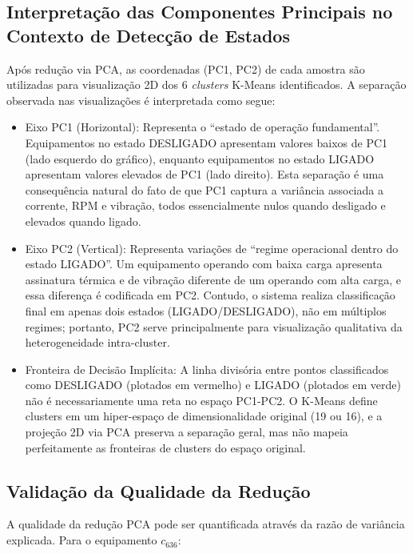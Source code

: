 \subsection{Interpretação das Componentes Principais no Contexto de Detecção de Estados}

Após redução via PCA, as coordenadas (PC1, PC2) de cada amostra são utilizadas para visualização 2D dos 6 \textit{clusters} K-Means identificados. A separação observada nas visualizações é interpretada como segue:

\begin{itemize}
    \item Eixo PC1 (Horizontal): Representa o ``estado de operação fundamental''. Equipamentos no estado DESLIGADO apresentam valores baixos de PC1 (lado esquerdo do gráfico), enquanto equipamentos no estado LIGADO apresentam valores elevados de PC1 (lado direito). Esta separação é uma consequência natural do fato de que PC1 captura a variância associada a corrente, RPM e vibração, todos essencialmente nulos quando desligado e elevados quando ligado.

    \item Eixo PC2 (Vertical): Representa variações de ``regime operacional dentro do estado LIGADO''. Um equipamento operando com baixa carga apresenta assinatura térmica e de vibração diferente de um operando com alta carga, e essa diferença é codificada em PC2. Contudo, o sistema realiza classificação final em apenas dois estados (LIGADO/DESLIGADO), não em múltiplos regimes; portanto, PC2 serve principalmente para visualização qualitativa da heterogeneidade intra-cluster.

    \item Fronteira de Decisão Implícita: A linha divisória entre pontos classificados como DESLIGADO (plotados em vermelho) e LIGADO (plotados em verde) não é necessariamente uma reta no espaço PC1-PC2. O K-Means define clusters em um hiper-espaço de dimensionalidade original (19 ou 16), e a projeção 2D via PCA preserva a separação geral, mas não mapeia perfeitamente as fronteiras de clusters do espaço original.
\end{itemize}

\subsection{Validação da Qualidade da Redução}

A qualidade da redução PCA pode ser quantificada através da razão de variância explicada. Para o equipamento $c_{636}$:

